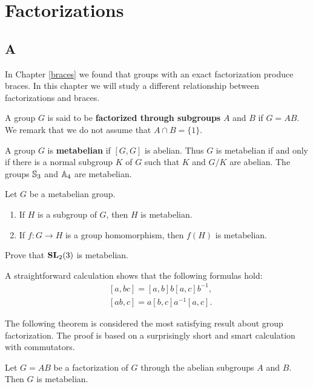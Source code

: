 \chapter{Factorizations}
\label{factorizations}

\section*{A}

In Chapter \ref{braces} we found that groups with an exact factorization 
produce braces. In this chapter we will study a different relationship between
factorizations and braces. 

A group $G$ is said to be 
\textbf{factorized through subgroups} $A$ and $B$ if $G=AB$. We remark that we do not assume that
$A\cap B=\{1\}$. 

A group $G$ is \textbf{metabelian} if $[G,G]$ is abelian. 
Thus $G$ is metabelian if and only if there is a normal subgroup 
$K$ of $G$ such that $K$ and $G/K$ are abelian. 
The groups $\mathbb{S}_3$ and $\mathbb{A}_4$ are metabelian. 

\begin{exercise}
	Let $G$ be a metabelian group.  
	\begin{enumerate}
		\item If $H$ is a subgroup of $G$, then $H$ is metabelian. 
		\item If $f\colon G\to H$ is a group homomorphism, then $f(H)$ is metabelian.
	\end{enumerate}
\end{exercise}

\begin{exercise}
	Prove that $\mathbf{SL}_2(3)$ is metabelian. 
\end{exercise}

A straightforward calculation shows that 
the following formulas hold: 
\begin{align*}
&[a,bc]=[a,b]b[a,c]b^{-1},\\ 
&[ab,c]=a[b,c]a^{-1}[a,c].
\end{align*}

The following theorem is considered the most satisfying result about group factorization. The proof
is based on a surprisingly short and smart calculation with commutators. 

\begin{theorem}[It\^o]
	\label{theorem:Ito}
	Let $G=AB$ be a factorization of $G$ through the abelian subgroups $A$ and $B$. 
	Then $G$ is metabelian.
\end{theorem}

